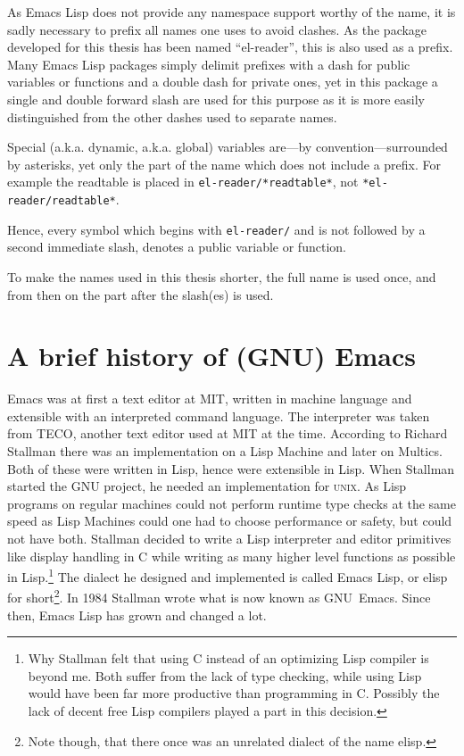 \documentclass[a4paper,10pt,twoside]{report}
\newcommand{\el}{Emacs Lisp}
\newcommand{\sym}[1]{\texttt{#1}}
\newcommand{\emacs}{GNU~Emacs}
\newcommand{\unix}{\textsc{unix}}
\begin{document}
As \el{} does not provide any namespace support worthy of the name, it is sadly
necessary to prefix all names one uses to avoid clashes.  As the package
developed for this thesis has been named ``el-reader'', this is also used as a
prefix.  Many \el{} packages simply delimit prefixes with a dash for public
variables or functions and a double dash for private ones, yet in this package a
single and double forward slash are used for this purpose as it is more easily
distinguished from the other dashes used to separate names.

Special (a.k.a. dynamic, a.k.a. global) variables are---by
convention---surrounded by asterisks, yet only the part of the name which does
not include a prefix.  For example the readtable is placed in
\sym{el-reader/*readtable*}, not \sym{*el-reader/readtable*}.

Hence, every symbol which begins with \sym{el-reader/} and is not followed by a
second immediate slash, denotes a public variable or function.

To make the names used in this thesis shorter, the full name is used once, and
from then on the part after the slash(es) is used.

\section{A brief history of (GNU) Emacs}
\label{sec:emacs-intro}

Emacs was at first a text editor at MIT, written in machine language and
extensible with an interpreted command language.  The interpreter was taken from
TECO, another text editor used at MIT at the time.  According to Richard
Stallman \cite{emacs-hist} there was an implementation on a Lisp Machine and
later on Multics.  Both of these were written in Lisp, hence were extensible in
Lisp.  When Stallman started the GNU project, he needed an implementation for
\unix{}.  As Lisp programs on regular machines could not perform runtime type
checks at the same speed as Lisp Machines could one had to choose performance or
safety, but could not have both.  Stallman decided to write a Lisp interpreter
and editor primitives like display handling in C while writing as many higher
level functions as possible in Lisp.\footnote{Why Stallman felt that using C
  instead of an optimizing Lisp compiler is beyond me.  Both suffer from the
  lack of type checking, while using Lisp would have been far more productive
  than programming in C.  Possibly the lack of decent free Lisp compilers played
  a part in this decision.}  The dialect he designed and implemented is called
\el{}, or elisp for short\footnote{Note though, that there once was an unrelated
  dialect of the name elisp.}.  In 1984 Stallman wrote what is now known as
\emacs{}\cite{emacs-first-release}. Since then, \el{} has grown and changed a
lot.
\end{document}
